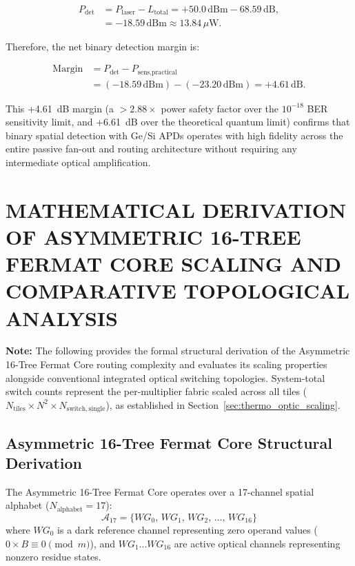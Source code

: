 \documentclass[journal]{IEEEtran}
\begin{document}
\begin{equation}
\begin{aligned}
P_{\text{det}} &= P_{\text{laser}} - L_{\text{total}}
= +50.0\,\text{dBm} - 68.59\,\text{dB},\\
&= -18.59\,\text{dBm} \approx 13.84\,\mu\text{W}.
\end{aligned}
\end{equation}

Therefore, the net binary detection margin is:

\begin{equation}
\begin{aligned}
\text{Margin} &= P_{\text{det}} - P_{\text{sens,practical}} \\
&= (-18.59\,\text{dBm}) - (-23.20\,\text{dBm}) = +4.61\,\text{dB}.
\end{aligned}
\end{equation}

This +4.61~dB margin (a $> 2.88\times$ power safety factor over the $10^{-18}$ BER sensitivity limit, and +6.61~dB over the theoretical quantum limit) confirms that binary spatial detection with Ge/Si APDs operates with high fidelity across the entire passive fan-out and routing architecture without requiring any intermediate optical amplification.

\section{MATHEMATICAL DERIVATION OF ASYMMETRIC 16-TREE FERMAT CORE SCALING AND COMPARATIVE TOPOLOGICAL ANALYSIS}
\label{app:benes_complexity}

\textbf{Note:} The following provides the formal structural derivation of the Asymmetric 16-Tree Fermat Core routing complexity and evaluates its scaling properties alongside conventional integrated optical switching topologies. System-total switch counts represent the per-multiplier fabric scaled across all tiles ($N_{\mathrm{tiles}} \times N^2 \times N_{\mathrm{switch,single}}$), as established in Section~\ref{sec:thermo_optic_scaling}.

\subsection{\textbf{Asymmetric 16-Tree Fermat Core Structural Derivation}}

The Asymmetric 16-Tree Fermat Core operates over a 17-channel spatial alphabet ($N_{\mathrm{alphabet}} = 17$):
\begin{equation}
\mathcal{A}_{17} = \{ WG_0, \, WG_1, \, WG_2, \, \dots, \, WG_{16} \}
\end{equation}
where $WG_0$ is a dark reference channel representing zero operand values ($0 \times B \equiv 0 \pmod{m}$), and $WG_1 \dots WG_{16}$ are active optical channels representing nonzero residue states.
\end{document}
